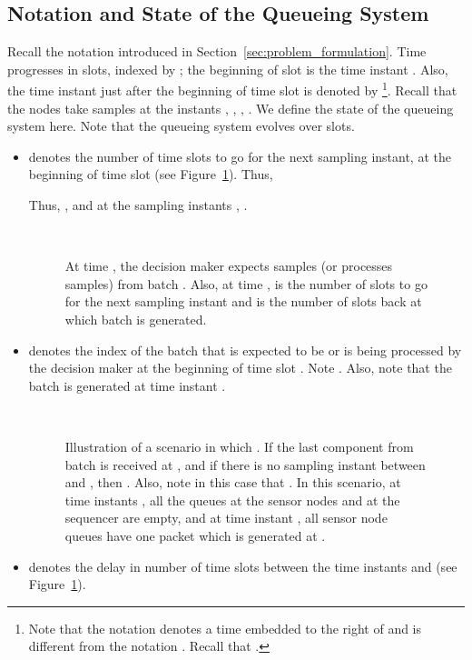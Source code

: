 \documentclass[acmtosn]{acmtrans2m}
\begin{document}
\subsection{Notation and State of the Queueing System}
\label{subsec:notation}
Recall the notation introduced in Section~\ref{sec:problem_formulation}.
Time progresses in slots, indexed by ; the beginning 
of slot  is the time instant . Also, the time instant 
just after the beginning of time slot is denoted by  
\footnote{Note that the notation  denotes a time embedded to the
right of  and is different from the notation .
Recall that .}. 
Recall that the nodes take samples at the instants 
, , , . We define the state of the queueing system here. Note that the queueing system evolves over slots.
\begin{itemize}
\item[]  denotes the number 
      of time slots to go for the next sampling instant, at the beginning
      of time slot  (see Figure~\ref{fig:lambda-delta}). Thus,

      
      Thus, , and at the sampling instants , .

 \begin{figure}[t]
   \centering \
   \caption{At time , the decision maker expects samples (or processes
   samples) from batch . Also, at time ,  is the 
   number of slots to go for the next sampling instant and
    is the number of slots back at which batch  is generated.}
\label{fig:lambda-delta}
 \end{figure}

\item[]  denotes the index of the 
      batch that is expected to be or is being processed by the decision maker 
      at the beginning of time slot . Note . Also, note that the batch  is generated at 
      time instant . 

 \begin{figure}[t]
   \centering \
   \caption{Illustration of a scenario in which . If the 
    last component from batch  is received at , and if there 
    is no sampling instant between  and , then .
    Also, note in this case that .
    In this scenario, at time instants , all the queues 
    at the sensor nodes and at the sequencer are empty, and at time instant
    , all sensor node queues have one packet which is generated at .  
   }
 \label{fig:delta-future-b}
 \end{figure}
\item[]  denotes the delay 
      in number of time slots between the time instants  and 
       (see Figure~\ref{fig:lambda-delta}). 
      

\end{itemize}
\end{document}

